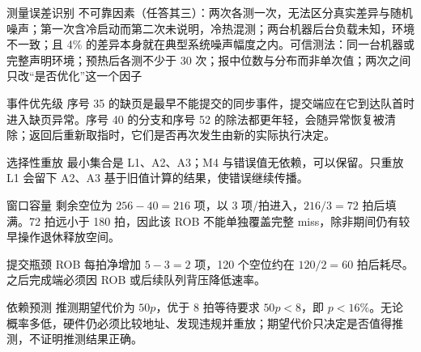 \begin{chapteranswer}{测量误差识别}
不可靠因素（任答其三）：两次各测一次，无法区分真实差异与随机噪声；第一次含冷启动而第二次未说明，冷热混测；两台机器后台负载未知，环境不一致；且 4\% 的差异本身就在典型系统噪声幅度之内。可信测法：同一台机器或完整声明环境；预热后各测不少于 30 次；报中位数与分布而非单次值；两次之间只改“是否优化”这一个因子
\end{chapteranswer}

\begin{chapteranswer}{事件优先级}
序号 35 的缺页是最早不能提交的同步事件，提交端应在它到达队首时进入缺页异常。序号 40 的分支和序号 52 的除法都更年轻，会随异常恢复被清除；返回后重新取指时，它们是否再次发生由新的实际执行决定。
\end{chapteranswer}

\begin{chapteranswer}{选择性重放}
最小集合是 L1、A2、A3；M4 与错误值无依赖，可以保留。只重放 L1 会留下 A2、A3 基于旧值计算的结果，使错误继续传播。
\end{chapteranswer}

\begin{chapteranswer}{窗口容量}
剩余空位为 $256-40=216$ 项，以 3 项/拍进入，$216/3=72$ 拍后填满。72 拍远小于 180 拍，因此该 ROB 不能单独覆盖完整 miss，除非期间仍有较早操作退休释放空间。
\end{chapteranswer}

\begin{chapteranswer}{提交瓶颈}
ROB 每拍净增加 $5-3=2$ 项，120 个空位约在 $120/2=60$ 拍后耗尽。之后完成端必须因 ROB 或后续队列背压降低速率。
\end{chapteranswer}

\begin{chapteranswer}{依赖预测}
推测期望代价为 $50p$，优于 8 拍等待要求 $50p<8$，即 $p<16\%$。无论概率多低，硬件仍必须比较地址、发现违规并重放；期望代价只决定是否值得推测，不证明推测结果正确。
\end{chapteranswer}
